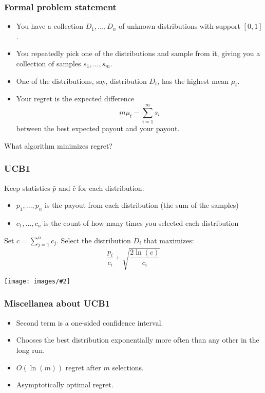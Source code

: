 \documentclass[table]{beamer}
\newcommand\img[2]{\texttt{[image: images/\#2]}}
\begin{document}
\begin{frame}
	\frametitle{Formal problem statement}
	\begin{itemize}
		\item You have a collection $D_1,\ldots,D_n$ of unknown distributions with
			support $[0,1]$.
		\item You repeatedly pick one of the distributions and sample from
			it, giving you a collection of samples $s_1,\ldots,s_m$.
		\item One of the distributions, say, distribution $D_t$, has the
			highest mean $\mu_t$.
		\item Your \alert{regret} is the expected difference
			\[m\mu_t - \sum_{i=1}^m s_i\]
			between the best expected payout and your payout.
	\end{itemize}

	What algorithm minimizes regret?
\end{frame}

\begin{frame}
	\frametitle{UCB1}
	Keep statistics $\bar p$ and $\bar c$ for each distribution:
	\begin{itemize}
		\item $p_1,\ldots,p_n$ is the \alert{payout} from each distribution (the sum
			of the samples)
		\item $c_1,\ldots,c_n$ is the \alert{count} of how many times you
			selected each distribution
	\end{itemize}
	Set $c=\sum_{j=1}^n c_j$. Select the distribution $D_i$ that maximizes:
	\[\frac{p_i}{c_i} + \sqrt{\frac{2\ln(c)}{c_i}}\]

	\pause

	\begin{center}
		\img{0.4}{confused.jpg}
	\end{center}
\end{frame}

\begin{frame}
	\frametitle{Miscellanea about UCB1}

	\begin{itemize}
		\item Second term is a one-sided confidence interval.
		\item Chooses the best distribution exponentially more often than
			any other in the long run.
		\item $O(\ln(m))$ regret after $m$ selections.
		\item Asymptotically optimal regret.
	\end{itemize}
\end{frame}
\end{document}
